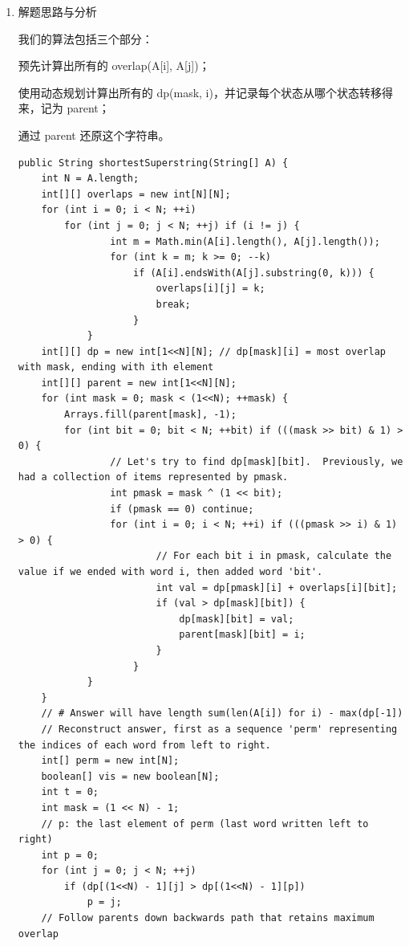 \documentclass[9pt, b5paaper]{book}
\begin{document}
\begin{enumerate}
\item 解题思路与分析
\label{sec-1-4-56-1}

我们的算法包括三个部分：

预先计算出所有的 overlap(A[i], A[j])；

使用动态规划计算出所有的 dp(mask, i)，并记录每个状态从哪个状态转移得来，记为 parent；

通过 parent 还原这个字符串。

\begin{verbatim}
public String shortestSuperstring(String[] A) {
    int N = A.length;
    int[][] overlaps = new int[N][N];
    for (int i = 0; i < N; ++i)
        for (int j = 0; j < N; ++j) if (i != j) {
                int m = Math.min(A[i].length(), A[j].length());
                for (int k = m; k >= 0; --k)
                    if (A[i].endsWith(A[j].substring(0, k))) {
                        overlaps[i][j] = k;
                        break;
                    }
            }
    int[][] dp = new int[1<<N][N]; // dp[mask][i] = most overlap with mask, ending with ith element
    int[][] parent = new int[1<<N][N];
    for (int mask = 0; mask < (1<<N); ++mask) {
        Arrays.fill(parent[mask], -1);
        for (int bit = 0; bit < N; ++bit) if (((mask >> bit) & 1) > 0) {
                // Let's try to find dp[mask][bit].  Previously, we had a collection of items represented by pmask.
                int pmask = mask ^ (1 << bit);
                if (pmask == 0) continue;
                for (int i = 0; i < N; ++i) if (((pmask >> i) & 1) > 0) {
                        // For each bit i in pmask, calculate the value if we ended with word i, then added word 'bit'.
                        int val = dp[pmask][i] + overlaps[i][bit];
                        if (val > dp[mask][bit]) {
                            dp[mask][bit] = val;
                            parent[mask][bit] = i;
                        }
                    }
            }
    }
    // # Answer will have length sum(len(A[i]) for i) - max(dp[-1])
    // Reconstruct answer, first as a sequence 'perm' representing the indices of each word from left to right.
    int[] perm = new int[N];
    boolean[] vis = new boolean[N];
    int t = 0;
    int mask = (1 << N) - 1;
    // p: the last element of perm (last word written left to right)
    int p = 0;
    for (int j = 0; j < N; ++j)
        if (dp[(1<<N) - 1][j] > dp[(1<<N) - 1][p])
            p = j;
    // Follow parents down backwards path that retains maximum overlap

\end{verbatim}
\end{enumerate}
\end{document}

